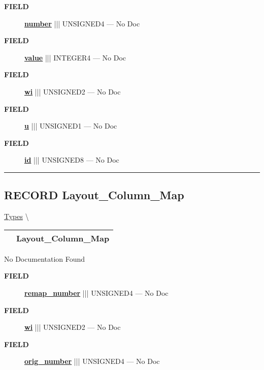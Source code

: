 \par
\begin{description}
\item [\colorbox{tagtype}{\color{white} \textbf{\textsf{FIELD}}}] \textbf{\underline{number}} ||| UNSIGNED4 --- No Doc
\item [\colorbox{tagtype}{\color{white} \textbf{\textsf{FIELD}}}] \textbf{\underline{value}} ||| INTEGER4 --- No Doc
\item [\colorbox{tagtype}{\color{white} \textbf{\textsf{FIELD}}}] \textbf{\underline{wi}} ||| UNSIGNED2 --- No Doc
\item [\colorbox{tagtype}{\color{white} \textbf{\textsf{FIELD}}}] \textbf{\underline{u}} ||| UNSIGNED1 --- No Doc
\item [\colorbox{tagtype}{\color{white} \textbf{\textsf{FIELD}}}] \textbf{\underline{id}} ||| UNSIGNED8 --- No Doc
\end{description}





\rule{\linewidth}{0.5pt}
\subsection*{\textsf{\colorbox{headtoc}{\color{white} RECORD}
Layout\_Column\_Map}}

\hypertarget{ecldoc:logisticregression.types.layout_column_map}{}
\hspace{0pt} \hyperlink{ecldoc:LogisticRegression.Types}{Types} \textbackslash 

{\renewcommand{\arraystretch}{1.5}
\begin{tabularx}{\textwidth}{|>{\raggedright\arraybackslash}l|X|}
\hline
\hspace{0pt}\mytexttt{\color{red} } & \textbf{Layout\_Column\_Map} \\
\hline
\end{tabularx}
}

\par





No Documentation Found







\par
\begin{description}
\item [\colorbox{tagtype}{\color{white} \textbf{\textsf{FIELD}}}] \textbf{\underline{remap\_number}} ||| UNSIGNED4 --- No Doc
\item [\colorbox{tagtype}{\color{white} \textbf{\textsf{FIELD}}}] \textbf{\underline{wi}} ||| UNSIGNED2 --- No Doc
\item [\colorbox{tagtype}{\color{white} \textbf{\textsf{FIELD}}}] \textbf{\underline{orig\_number}} ||| UNSIGNED4 --- No Doc
\end{description}





